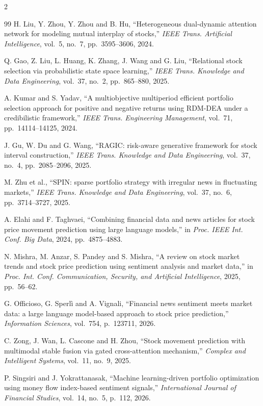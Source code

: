 \begin{footnotesize}
\begin{multicols}{2}
\begin{thebibliography}{99}
 H. Liu, Y. Zhou, Y. Zhou and B. Hu, ``Heterogeneous
dual-dynamic attention network for modeling mutual interplay of stocks,'' \emph{IEEE
Trans. Artificial Intelligence}, vol.~5, no.~7, pp.~3595--3606, 2024.

 Q. Gao, Z. Liu, L. Huang, K. Zhang, J. Wang and G. Liu,
``Relational stock selection via probabilistic state space learning,'' \emph{IEEE Trans.
Knowledge and Data Engineering}, vol.~37, no.~2, pp.~865--880, 2025.

 A. Kumar and S. Yadav, ``A multiobjective multiperiod efficient
portfolio selection approach for positive and negative returns using RDM-DEA under a
credibilistic framework,'' \emph{IEEE Trans. Engineering Management}, vol.~71,
pp.~14114--14125, 2024.

 J. Gu, W. Du and G. Wang, ``RAGIC: risk-aware generative framework
for stock interval construction,'' \emph{IEEE Trans. Knowledge and Data Engineering},
vol.~37, no.~4, pp.~2085--2096, 2025.

 M. Zhu et al., ``SPIN: sparse portfolio strategy with irregular news
in fluctuating markets,'' \emph{IEEE Trans. Knowledge and Data Engineering}, vol.~37,
no.~6, pp.~3714--3727, 2025.

 A. Elahi and F. Taghvaei, ``Combining financial data and news articles
for stock price movement prediction using large language models,'' in \emph{Proc. IEEE
Int. Conf. Big Data}, 2024, pp.~4875--4883.

 N. Mishra, M. Anzar, S. Pandey and S. Mishra, ``A review on stock
market trends and stock price prediction using sentiment analysis and market data,'' in
\emph{Proc. Int. Conf. Communication, Security, and Artificial Intelligence}, 2025,
pp.~56--62.

 G. Officioso, G. Sperl\`i and A. Vignali, ``Financial news
sentiment meets market data: a large language model-based approach to stock price
prediction,'' \emph{Information Sciences}, vol.~754, p.~123711, 2026.

 C. Zong, J. Wan, L. Cascone and H. Zhou, ``Stock movement prediction
with multimodal stable fusion via gated cross-attention mechanism,'' \emph{Complex and
Intelligent Systems}, vol.~11, no.~9, 2025.

 P. Singsiri and J. Yokrattanasak, ``Machine learning-driven
portfolio optimization using money flow index-based sentiment signals,''
\emph{International Journal of Financial Studies}, vol.~14, no.~5, p.~112, 2026.


\end{thebibliography}
\end{multicols}
\end{footnotesize}
